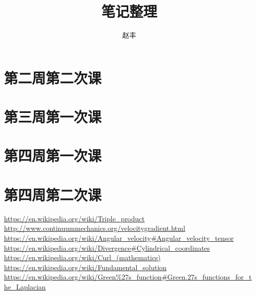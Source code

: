 \documentclass{article}
\begin{document}
\title{笔记整理}
\author{赵丰}
\maketitle
\tableofcontents
\section{第二周第二次课}

\section{第三周第一次课}

\section{第四周第一次课}

\section{第四周第二次课}

\begin{thebibliography}{9}
 \href{https://en.wikipedia.org/wiki/Triple_product}{https://en.wikipedia.org/wiki/Triple\_product}
\href{http://www.continuummechanics.org/velocitygradient.html}{http://www.continuummechanics.org/velocitygradient.html}
\href{https://en.wikipedia.org/wiki/Angular_velocity#Angular_velocity_tensor}{https://en.wikipedia.org/wiki/Angular\_velocity\#Angular\_velocity\_tensor}
\href{https://en.wikipedia.org/wiki/Divergence#Cylindrical_coordinates}{https://en.wikipedia.org/wiki/Divergence\#Cylindrical\_coordinates}
\href{https://en.wikipedia.org/wiki/Curl_(mathematics)}{https://en.wikipedia.org/wiki/Curl\_(mathematics)}
\href{https://en.wikipedia.org/wiki/Fundamental_solution}{https://en.wikipedia.org/wiki/Fundamental\_solution}
\href{https://en.wikipedia.org/wiki/Green\%27s_function#Green.27s_functions_for_the_Laplacian}{https://en.wikipedia.org/wiki/Green\%27s\_function\#Green.27s\_functions\_for\_the\_Laplacian}
\end{thebibliography}
\end{document}
